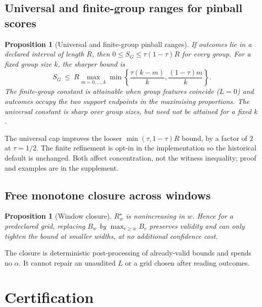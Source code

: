 \documentclass[11pt]{article}
\newtheorem{proposition}[theorem]{Proposition}
\theoremstyle{definition}
\newcommand{\risk}{R^{\star}}
\begin{document}
\subsection{Universal and finite-group ranges for pinball scores}

\begin{proposition}[Universal and finite-group pinball ranges]\label{prop:pincap}
If outcomes lie in a declared interval of length $R$, then $0\le S_G\le\tau(1-\tau)R$ for every group. For a fixed group size $k$, the sharper bound is
\begin{equation}\label{eq:finitecap}
S_G\ \le\ R\max_{m=0,\ldots,k}\min\!\left\{\frac{\tau(k-m)}{k},\frac{(1-\tau)m}{k}\right\}.
\end{equation}
The finite-group constant is attainable when group features coincide ($L=0$) and outcomes occupy the two support endpoints in the maximising proportions. The universal constant is sharp over group sizes, but need not be attained for a fixed $k$.
\end{proposition}
The universal cap improves the looser $\min(\tau,1-\tau)R$ bound, by a factor of $2$ at $\tau=1/2$. The finite refinement is opt-in in the implementation so the historical default is unchanged. Both affect concentration, not the witness inequality; proof and examples are in the supplement.

\subsection{Free monotone closure across windows}

\begin{proposition}[Window closure]\label{prop:wclose}
$\risk_{w}$ is nonincreasing in $w$. Hence for a predeclared grid, replacing $B_w$ by $\max_{v\ge w}B_v$ preserves validity and can only tighten the bound at smaller widths, at no additional confidence cost.
\end{proposition}
The closure is deterministic post-processing of already-valid bounds and spends no $\alpha$. It cannot repair an unaudited $L$ or a grid chosen after reading outcomes.

\section{Certification}\label{sec:cert}
\end{document}
